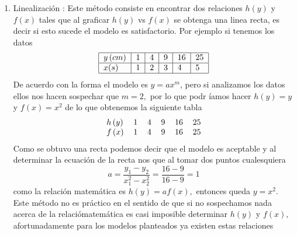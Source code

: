 \documentclass[12pt]{article}
\begin{document}
\begin{enumerate}
\item  Linealizaci\'{o}n :\newline
Este m\'{e}todo consiste en encontrar dos relaciones $h\left( y\right) $ y $%
f\left( x\right) $ tales que al graficar $h\left( y\right) $ vs $f\left(
x\right) $ se obtenga una linea recta, es decir si esto sucede el modelo es
satisfactorio.\newline
Por ejemplo si tenemos los datos 
\begin{equation*}
\begin{tabular}{|l|l|l|l|l|l|}
\hline
$y\left( cm\right) $ & 1 & 4 & 9 & 16 & 25 \\ \hline
$x(s)$ & 1 & 2 & 3 & 4 & 5 \\ \hline
\end{tabular}
\end{equation*}
De acuerdo con la forma el modelo es $y=ax^{m}$, pero si
analizamos los datos ellos nos hacen sospechar que $m=2,$ por lo que podr%
\'{i}amos hacer $h\left( y\right) =y$ y $f\left( x\right) =x^{2}$ de lo que
obtenemos la siguiente tabla 
\begin{equation*}
\begin{tabular}{llllll}
$h\left( y\right) $ & 1 & 4 & 9 & 16 & 25 \\ 
$f\left( x\right) $ & 1 & 4 & 9 & 16 & 25
\end{tabular}
\end{equation*}
Como se obtuvo una recta podemos decir que el modelo es aceptable
y al determinar la ecuaci\'{o}n de la recta nos que al tomar dos puntos
cualesquiera 
\begin{equation*}
a=\frac{y_{1}-y_{2}}{x_{1}^{2}-x_{2}^{2}}=\frac{16-9}{16-9}=1
\end{equation*}
como la relaci\'{o}n matem\'{a}tica es $h\left( y\right) =af\left( x\right)
, $ entonces queda $y=x^{2}.$\newline
Este m\'{e}todo no es pr\'{a}ctico en el sentido de que si no sospechamos
nada acerca de la relaci\'{o}matem\'{a}tica es casi imposible determinar $%
h\left( y\right) $ y $f\left( x\right) ,$ afortunadamente para los modelos
planteados ya existen estas relaciones


\end{enumerate}
\end{document}
